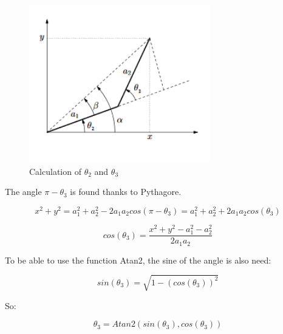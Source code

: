 \begin{figure}[!ht]
	\centering
    \includegraphics[width = 0.7\textwidth]{Images/angles}
    \caption{Calculation of $\theta_2$ and $\theta_3$}
    \label{fig:angles}
\end{figure}

The angle $\pi - \theta_3$ is found thanks to Pythagore.\\

\begin{center}
	\begin{equation}
		x^2 + y^2 = a_1^2 + a_2^2 - 2a_1a_2cos(\pi - \theta_3) = a_1^2 + a_2^2 + 2a_1a_2cos(\theta_3)
	\end{equation}
\end{center}

\begin{center}
	\begin{equation}
		cos(\theta_3) = \frac{x^2 + y^2 - a_1^2 - a_2^2}{2a_1a_2}
	\end{equation}
\end{center}

To be able to use the function Atan2, the sine of the angle is also need:\\

\begin{center}
	\begin{equation}
		sin(\theta_3) = \sqrt{1 - (cos(\theta_3))^2}
	\end{equation}
\end{center}

So: \\

\begin{center}
	\begin{equation}
		\theta_3 = Atan2(sin(\theta_3),cos(\theta_3))
	\end{equation}
\end{center}

